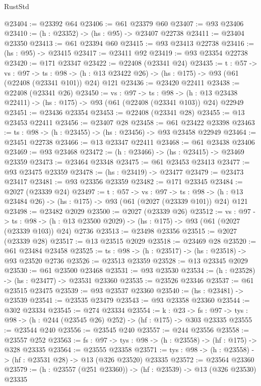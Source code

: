 \begin{lexlean}{RustStd}
\begin{coremodule}
@23404 := @23392 @64
@23406 := @61 @23379 @60
@23407 := @93 @23406
@23410 := (h : @23352) -> (hs : @95) -> @23407 @22738
@23411 := @23404 @23350
@23413 := @61 @23394 @60
@23415 := @93 @23413 @22738
@23416 := (hs : @95) -> @23415
@23417 := @23411 @92
@23419 := @93 @23354 @22738
@23420 := @171 @23347
@23422 := @22408 (@23341 @24)
@23435 := {t : @57} ->
  {vs : @97} ->
  {ts : @98} -> (h : @13 @23422 @26) -> (hs : @175) -> @93 (@61 (@22408 (@23341 @101)) @24) @121
@23436 := @23420 @22411
@23438 := @22408 (@23341 @26)
@23450 := {vs : @97} ->
  {ts : @98} ->
  (h : @13 @23438 @22411) -> (hs : @175) -> @93 (@61 (@22408 (@23341 @103)) @24) @22949
@23451 := @23436 @23354
@23453 := @22408 (@23341 @28)
@23455 := @13 @23453 @22411
@23456 := @23407 @28
@23458 := @61 @23422 @23398
@23463 := {ts : @98} -> (h : @23455) -> (hs : @23456) -> @93 @23458 @22949
@23464 := @23451 @22738
@23466 := @13 @23347 @22411
@23468 := @61 @23438 @23406
@23469 := @93 @23468
@23472 := (h : @23466) -> (hs : @23415) -> @23469 @23359
@23473 := @23464 @23348
@23475 := @61 @23453 @23413
@23477 := @93 @23475 @23359
@23478 := (hs : @23419) -> @23477
@23479 := @23473 @23417
@23481 := @93 @23356 @23359
@23482 := @171 @23345
@23484 := @2027 (@23339 @24)
@23497 := {t : @57} ->
  {vs : @97} ->
  {ts : @98} -> (h : @13 @23484 @26) -> (hs : @175) -> @93 (@61 (@2027 (@23339 @101)) @24) @121
@23498 := @23482 @2029
@23500 := @2027 (@23339 @26)
@23512 := {vs : @97} ->
  {ts : @98} -> (h : @13 @23500 @2029) -> (hs : @175) -> @93 (@61 (@2027 (@23339 @103)) @24) @2736
@23513 := @23498 @23356
@23515 := @2027 (@23339 @28)
@23517 := @13 @23515 @2029
@23518 := @23469 @28
@23520 := @61 @23484 @23458
@23525 := {ts : @98} -> (h : @23517) -> (hs : @23518) -> @93 @23520 @2736
@23526 := @23513 @23359
@23528 := @13 @23345 @2029
@23530 := @61 @23500 @23468
@23531 := @93 @23530
@23534 := (h : @23528) -> (hs : @23477) -> @23531 @23360
@23535 := @23526 @23346
@23537 := @61 @23515 @23475
@23539 := @93 @23537 @23360
@23540 := (hs : @23481) -> @23539
@23541 := @23535 @23479
@23543 := @93 @23358 @23360
@23544 := @302 @23334
@23545 := @274 @23334
@23554 := {k : @23} ->
  {fs : @97} -> {tys : @98} -> (h : @244 (@23545 @26) @252) -> (hf : @175) -> @303 @23335
@23555 := @23544 @240
@23556 := @23545 @240
@23557 := @244 @23556
@23558 := @23557 @252
@23563 := {fs : @97} -> {tys : @98} -> (h : @23558) -> (hf : @175) -> @328 @23335
@23564 := @23555 @23358
@23571 := {tys : @98} -> (h : @23558) -> (hf : @23531 @28) -> @13 (@326 @23520) @23335
@23572 := @23564 @23360
@23579 := (h : @23557 (@251 @23360)) -> (hf : @23539) -> @13 (@326 @23530) @23335

\end{coremodule}
\end{lexlean}
